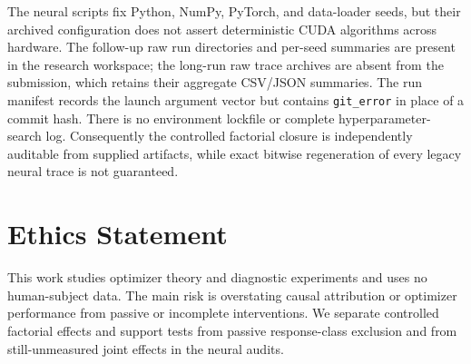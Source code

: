 The neural scripts fix Python, NumPy, PyTorch, and data-loader seeds, but their archived configuration does not assert deterministic CUDA algorithms across hardware.  The follow-up raw run directories and per-seed summaries are present in the research workspace; the long-run raw trace archives are absent from the submission, which retains their aggregate CSV/JSON summaries.  The run manifest records the launch argument vector but contains \texttt{git\_error} in place of a commit hash.  There is no environment lockfile or complete hyperparameter-search log.  Consequently the controlled factorial closure is independently auditable from supplied artifacts, while exact bitwise regeneration of every legacy neural trace is not guaranteed.

\section{Ethics Statement}
\label{sec:ethics}

This work studies optimizer theory and diagnostic experiments and uses no human-subject data.  The main risk is overstating causal attribution or optimizer performance from passive or incomplete interventions.  We separate controlled factorial effects and support tests from passive response-class exclusion and from still-unmeasured joint effects in the neural audits.
